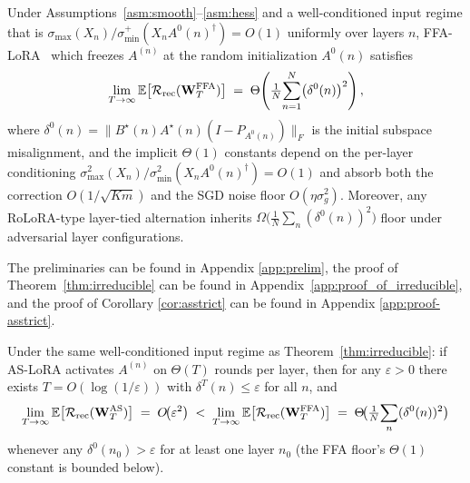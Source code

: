 \begin{theorem}\label{thm:irreducible}
Under Assumptions~\ref{asm:smooth}--\ref{asm:hess} and a well-conditioned input regime that is $\sigma_{\max}(X_n)/\sigma_{\min}^+(X_n A^0(n)^\dagger) = O(1)$ uniformly over layers $n$, FFA-LoRA~\citep{sun2024improving} which freezes $A^{(n)}$ at the random initialization $A^0(n)$ satisfies
\begin{equation}
\lim_{T\to\infty}\mathbb{E}\!\left[\mathcal R_\text{rec}(\mathbf W_T^{\text{FFA}})\right] \;=\; \Theta\!\left(\tfrac{1}{N}\!\sum_{n=1}^N\bigl(\delta^0(n)\bigr)^2\right),    
\end{equation}
where $\delta^0(n)\!=\!\|B^\star(n)A^\star(n)(I\!-\!P_{A^0(n)})\|_F$ is the initial subspace misalignment, and the implicit $\Theta(1)$ constants depend on the per-layer conditioning $\sigma_{\max}^2(X_n)/\sigma_{\min}^2(X_n A^0(n)^\dagger) = O(1)$ and absorb both the correction $O(1/\sqrt{Km})$ and the SGD noise floor $O(\eta\sigma_g^2)$. Moreover, any RoLoRA-type layer-tied alternation inherits $\Omega\!\bigl(\tfrac{1}{N}\sum_n(\delta^0(n))^2\bigr)$ floor under adversarial layer configurations.
\end{theorem}

The preliminaries can be found in Appendix \ref{app:prelim}, the proof of Theorem~\ref{thm:irreducible} can be found in Appendix~\ref{app:proof_of_irreducible}, and the proof of Corollary \ref{cor:asstrict} can be found in Appendix \ref{app:proof-asstrict}.

\begin{corollary}\label{cor:asstrict}
Under the same well-conditioned input regime as Theorem~\ref{thm:irreducible}: if AS-LoRA activates $A^{(n)}$ on $\Theta(T)$ rounds per layer, then for any $\varepsilon>0$ there exists $T=O(\log(1/\varepsilon))$ with $\delta^T(n)\!\le\!\varepsilon$ for all $n$, and
\begin{equation}
    \lim_{T\to\infty}\mathbb{E}\bigl[\mathcal R_\text{rec}(\mathbf W_T^{\text{AS}})\bigr] \;=\; O\!\bigl(\varepsilon^2\bigr) \;<\; \lim_{T\to\infty}\mathbb{E}\bigl[\mathcal R_\text{rec}(\mathbf W_T^{\text{FFA}})\bigr] \;=\; \Theta\!\bigl(\tfrac{1}{N}\!\sum_n(\delta^0(n))^2\bigr)
\end{equation}
whenever any $\delta^0(n_0)>\varepsilon$ for at least one layer $n_0$ (the FFA floor's $\Theta(1)$ constant is bounded below).
\end{corollary}

